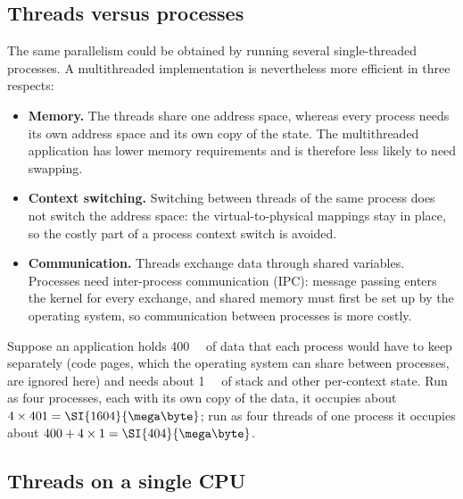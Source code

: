 \documentclass[../main.tex]{subfiles}
\begin{document}
\subsection{Threads versus processes}

The same parallelism could be obtained by running several single-threaded
processes.  A multithreaded implementation is nevertheless more efficient in
three respects:
\begin{itemize}
  \item \textbf{Memory.}  The threads share one address space, whereas every
    process needs its own address space and its own copy of the state.  The
    multithreaded application has lower memory requirements and is
    therefore less likely to need swapping.
  \item \textbf{Context switching.}  Switching between threads of the same
    process does not switch the address space: the virtual-to-physical
    mappings stay in place, so the costly part of a process context switch
    is avoided.
  \item \textbf{Communication.}  Threads exchange data through shared
    variables.  Processes need inter-process communication (IPC): message
    passing enters the kernel for every exchange, and shared memory must
    first be set up by the operating system, so communication between
    processes is more costly.
\end{itemize}

\begin{example}
  Suppose an application holds \SI{400}{\mega\byte} of data that each
  process would have to keep separately (code pages, which the operating
  system can share between processes, are ignored here) and needs about
  \SI{1}{\mega\byte} of stack and other per-context state.  Run as four
  processes, each with its own copy of the data, it occupies about
  $4\times 401 = \SI{1604}{\mega\byte}$; run as four threads of one
  process it occupies about $400 + 4\times 1 = \SI{404}{\mega\byte}$.
\end{example}

\subsection{Threads on a single CPU}
\end{document}
